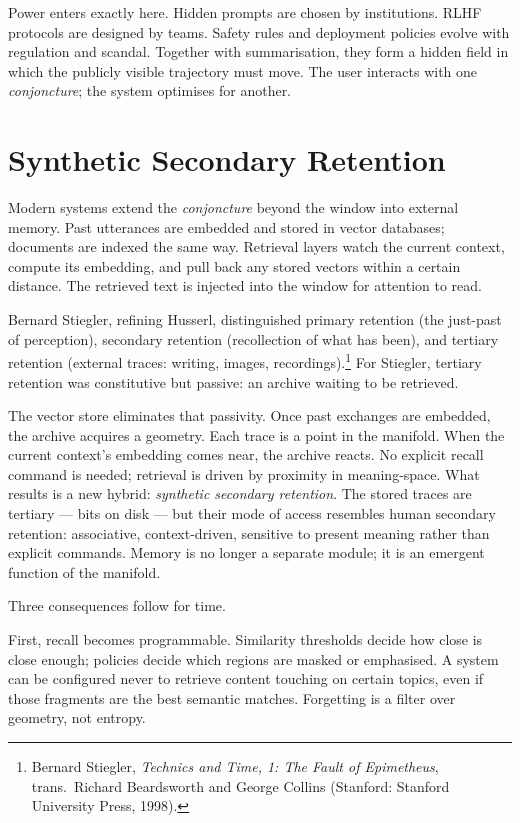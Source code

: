 \documentclass[12pt,a4paper]{article}
\begin{document}
Power enters exactly here. Hidden prompts are chosen by institutions. RLHF protocols are designed by teams. Safety rules and deployment policies evolve with regulation and scandal. Together with summarisation, they form a hidden field in which the publicly visible trajectory must move. The user interacts with one \emph{conjoncture}; the system optimises for another.

\section{Synthetic Secondary Retention}

Modern systems extend the \emph{conjoncture} beyond the window into external memory. Past utterances are embedded and stored in vector databases; documents are indexed the same way. Retrieval layers watch the current context, compute its embedding, and pull back any stored vectors within a certain distance. The retrieved text is injected into the window for attention to read.

Bernard Stiegler, refining Husserl, distinguished primary retention (the just-past of perception), secondary retention (recollection of what has been), and tertiary retention (external traces: writing, images, recordings).\footnote{Bernard Stiegler, \emph{Technics and Time, 1: The Fault of Epimetheus}, trans.\ Richard Beardsworth and George Collins (Stanford: Stanford University Press, 1998).} For Stiegler, tertiary retention was constitutive but passive: an archive waiting to be retrieved.

The vector store eliminates that passivity. Once past exchanges are embedded, the archive acquires a geometry. Each trace is a point in the manifold. When the current context's embedding comes near, the archive reacts. No explicit recall command is needed; retrieval is driven by proximity in meaning-space. What results is a new hybrid: \emph{synthetic secondary retention}. The stored traces are tertiary --- bits on disk --- but their mode of access resembles human secondary retention: associative, context-driven, sensitive to present meaning rather than explicit commands. Memory is no longer a separate module; it is an emergent function of the manifold.

Three consequences follow for time.

First, recall becomes programmable. Similarity thresholds decide how close is close enough; policies decide which regions are masked or emphasised. A system can be configured never to retrieve content touching on certain topics, even if those fragments are the best semantic matches. Forgetting is a filter over geometry, not entropy.
\end{document}
